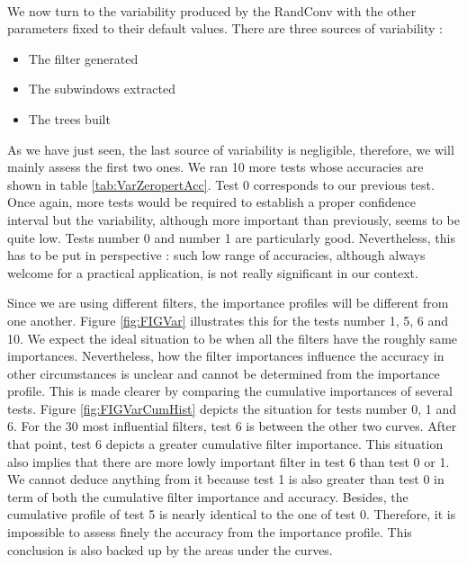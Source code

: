 \documentclass[a4paper]{report}
\begin{document}
		\paragraph{}
		We now turn to the variability produced by the RandConv with the other parameters fixed to their default values. There are three sources of variability :
		
		\begin{itemize}
			\item The filter generated
			\item The subwindows extracted
			\item The trees built
		\end{itemize}
		
		As we have just seen, the last source of variability is negligible, therefore, we will mainly assess the first two ones. We ran 10 more tests whose accuracies are shown in table \ref{tab:VarZeropertAcc}. Test 0 corresponds to our previous test. Once again, more tests would be required to establish a proper confidence interval but the variability, although more important than previously, seems to be quite low. Tests number 0 and number 1 are particularly good. Nevertheless, this has to be put in perspective : such low range of accuracies, although always welcome for a practical application, is not really significant in our context.
		\par
		Since we are using different filters, the importance profiles will be different from one another. Figure \ref{fig:FIGVar} illustrates this for the tests number 1, 5, 6 and 10. We expect the ideal situation to be when all the filters have the roughly same importances. Nevertheless, how the filter importances influence the accuracy in other circumstances is unclear and cannot be determined from the importance profile. This is made clearer by comparing the cumulative importances of several tests. Figure \ref{fig:FIGVarCumHist} depicts the situation for tests number 0, 1 and 6. For the 30 most influential filters, test 6 is between the other two curves. After that point, test 6 depicts a greater cumulative filter importance. This situation also implies that there are more lowly important filter in test 6 than test 0 or 1. We cannot deduce anything from it because test 1 is also greater than test 0 in term of both the cumulative filter importance and accuracy. Besides, the cumulative profile of test 5 is nearly identical to the one of test 0. Therefore, it is impossible to assess finely the accuracy from the importance profile. This conclusion is also backed up by the areas under the curves.
		
\end{document}
